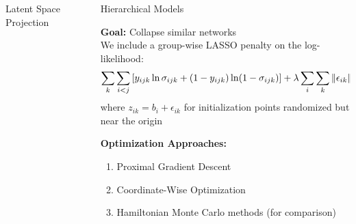 \documentclass[final]{beamer}
\newlength{\onecolwid}
\newlength{\twocolwid}
\begin{document}
\begin{frame}[t]
\begin{columns}[t]
\begin{column}{\twocolwid}
\begin{columns}[t,totalwidth=\twocolwid]
\begin{column}{\onecolwid}
\begin{block}{Latent Space Projection}

\end{block}


\end{column} %

\begin{column}{\onecolwid}\vspace{-.6in} %


  \begin{block}{Hierarchical Models}

    \textbf{Goal:} Collapse similar networks\\
    We include a group-wise LASSO penalty on the log-likelihood:
    \[\sum_k\sum_{i<j} \left[y_{ijk} \ln \sigma_{ijk}
        + (1-y_{ijk})\ln (1-\sigma_{ijk})\right] +
    \lambda\sum_i \sum_k \left\|\epsilon_{ik}\right\|_1\]
  where $z_{ik} = b_i + \epsilon_{ik}$ for initialization points
  randomized but near the origin


\textbf{Optimization Approaches:}
\begin{enumerate}
\item Proximal Gradient Descent
\item Coordinate-Wise Optimization
\item Hamiltonian Monte Carlo methods (for comparison)
\end{enumerate}



\end{block}
\end{column}
\end{columns}
\end{column}
\end{columns}
\end{frame}
\end{document}
